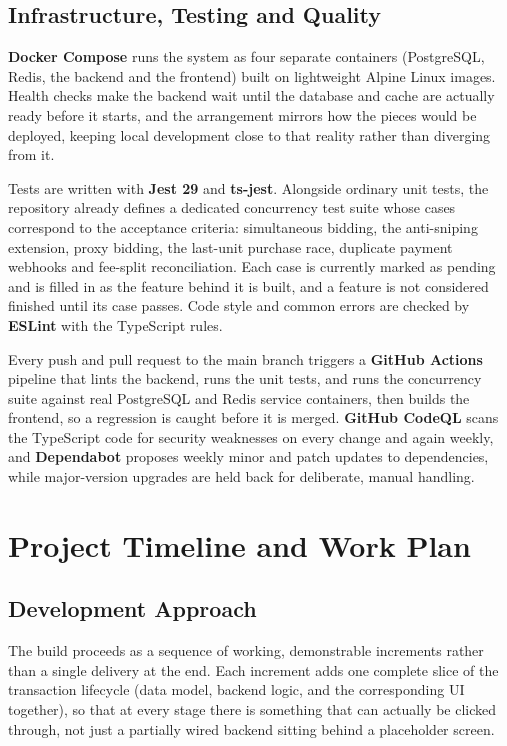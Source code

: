 \documentclass[11pt,a4paper]{article}
\begin{document}
\subsection{Infrastructure, Testing and Quality}

\textbf{Docker Compose} runs the system as four separate containers (PostgreSQL, Redis, the backend and the
frontend) built on lightweight Alpine Linux images. Health checks make the backend wait until the database
and cache are actually ready before it starts, and the arrangement mirrors how the pieces would be deployed,
keeping local development close to that reality rather than diverging from it.

Tests are written with \textbf{Jest 29} and \textbf{ts-jest}. Alongside ordinary unit tests, the repository
already defines a dedicated concurrency test suite whose cases correspond to the acceptance criteria:
simultaneous bidding, the anti-sniping extension, proxy bidding, the last-unit purchase race, duplicate
payment webhooks and fee-split reconciliation. Each case is currently marked as pending and is filled in as
the feature behind it is built, and a feature is not considered finished until its case passes. Code style and common errors are checked by \textbf{ESLint} with the
TypeScript rules.

Every push and pull request to the main branch triggers a \textbf{GitHub Actions} pipeline that lints the
backend, runs the unit tests, and runs the concurrency suite against real PostgreSQL and Redis service
containers, then builds the frontend, so a regression is caught before it is merged. \textbf{GitHub CodeQL}
scans the TypeScript code for security weaknesses on every change and again weekly, and
\textbf{Dependabot} proposes weekly minor and patch updates to dependencies, while major-version upgrades are
held back for deliberate, manual handling.

\section{Project Timeline and Work Plan}

\subsection{Development Approach}

The build proceeds as a sequence of working, demonstrable increments rather than a single delivery at
the end. Each increment adds one complete slice of the transaction lifecycle (data model, backend logic,
and the corresponding UI together), so that at every stage there is something that can actually be
clicked through, not just a partially wired backend sitting behind a placeholder screen.
\end{document}
